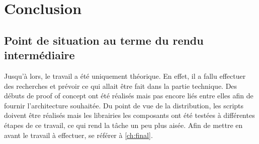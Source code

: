 \chapter{Conclusion}

\section{Point de situation au terme du rendu intermédiaire}
Jusqu'à lors, le travail a été uniquement théorique.
En effet, il a fallu effectuer des recherches et prévoir ce qui allait être fait dans la partie technique.
Des débuts de proof of concept ont été réalisés mais pas encore liés entre elles afin de fournir l'architecture souhaitée.
Du point de vue de la distribution, les scripts doivent être réalisés mais les librairies les composants ont été testées à différentes étapes de ce travail, ce qui rend la tâche un peu plus aisée.
Afin de mettre en avant le travail à effectuer, se référer à \ref{ch:final}.
